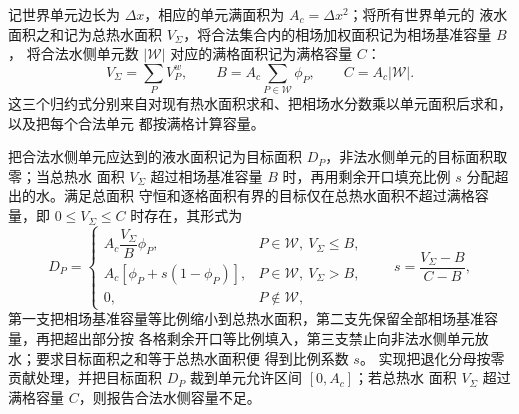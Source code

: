 \documentclass[UTF8,zihao=-4]{ctexart}
\newcommand{\cellarea}{A_c}
\numberwithin{equation}{section}
\begin{document}
记世界单元边长为 $\Delta x$，相应的单元满面积为 $\cellarea=\Delta x^2$；将所有世界单元的
液水面积之和记为总热水面积 $V_\Sigma$，将合法集合内的相场加权面积记为相场基准容量 $B$，
将合法水侧单元数 $|\mathcal W|$ 对应的满格面积记为满格容量 $C$：
\begin{equation}
  V_\Sigma=\sum_PV_P^w,
  \qquad B=\cellarea\sum_{P\in\mathcal W}\phi_P,
  \qquad C=\cellarea|\mathcal W|.
\end{equation}
这三个归约式分别来自对现有热水面积求和、把相场水分数乘以单元面积后求和，以及把每个合法单元
都按满格计算容量。

把合法水侧单元应达到的液水面积记为目标面积 $D_P$，非法水侧单元的目标面积取零；当总热水
面积 $V_\Sigma$ 超过相场基准容量 $B$ 时，再用剩余开口填充比例 $s$ 分配超出的水。满足总面积
守恒和逐格面积有界的目标仅在总热水面积不超过满格容量，即 $0\le V_\Sigma\le C$ 时存在，其形式为
\begin{equation}
  D_P=
  \begin{cases}
  \cellarea\dfrac{V_\Sigma}{B}\phi_P,
    &P\in\mathcal W,\ V_\Sigma\le B,\\[2mm]
  \cellarea\left[\phi_P+s(1-\phi_P)\right],
    &P\in\mathcal W,\ V_\Sigma>B,\\
  0,&P\notin\mathcal W,
  \end{cases}
  \qquad s=\frac{V_\Sigma-B}{C-B},
  \label{eq:aperture-target}
\end{equation}
第一支把相场基准容量等比例缩小到总热水面积，第二支先保留全部相场基准容量，再把超出部分按
各格剩余开口等比例填入，第三支禁止向非法水侧单元放水；要求目标面积之和等于总热水面积便
得到比例系数 $s$。
实现把退化分母按零贡献处理，并把目标面积 $D_P$ 裁到单元允许区间 $[0,\cellarea]$；若总热水
面积 $V_\Sigma$ 超过满格容量 $C$，则报告合法水侧容量不足。
\end{document}
